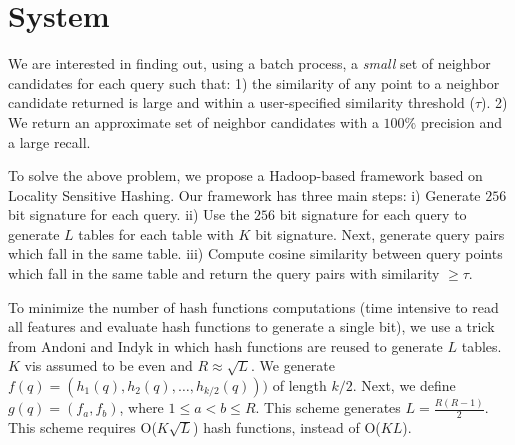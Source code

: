 \documentclass[11pt]{article}
\begin{document}
\section{System}
We are interested in finding out, using a batch process, a \emph{small} set of
neighbor candidates for each query such that: 1) the similarity of any
point to a neighbor candidate returned is large and within a user-specified 
similarity threshold ($\tau$). 2) We return an approximate set of neighbor 
candidates with a $100\%$ precision and a large recall. 

To solve the above problem, we propose a Hadoop-based framework based on Locality Sensitive Hashing. 
Our framework has three main steps: 
i) Generate $256$ bit signature for each query.  
ii) Use the $256$ bit signature for each query to generate $L$ tables for each table with $K$ bit signature. 
Next, generate query pairs which fall in the same table.
iii) Compute cosine similarity between query points which fall in the same table and return the query pairs  
with similarity $\geq\tau$.  


To minimize the number of hash functions computations (time intensive to read all features and 
evaluate hash functions to generate a single bit), we use a trick from Andoni and Indyk  
in which hash functions are reused to generate $L$ tables. $K$ vis assumed to be even and $R \approx	\sqrt L$. 
We generate $f(q)=(h_1(q),h_2(q),\dots,h_{k/2}(q)))$ of length $k/2$. 
Next, we define $g(q)=(f_a,f_b)$, where $1\leq a < b \leq R$. This scheme generates $L= \frac{R (R -1)}{2}$. 
This scheme requires O($K  \sqrt L$) hash functions, instead of O($KL$).    

\end{document}
